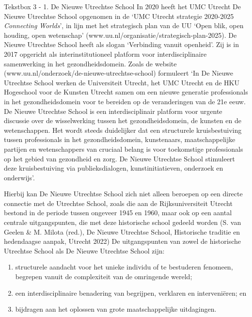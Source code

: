 \documentclass[smallauthor, chapterhaspagenum, nochapterinheader, pagenuminheader,  bigchapnum,medium2, tocpages,  garamond, titleinheader]{jote-book}
\begin{document}
	\begin{bookbox}{Tekstbox 3 - 1. De Nieuwe Utrechtse School}
		In 2020 heeft het UMC Utrecht De Nieuwe Utrechtse School opgenomen in de ‘UMC Utrecht strategie 2020-2025 \emph{Connecting}\emph{ }\emph{Worlds}', in lijn met het strategisch plan van de UU ‘Open blik, open houding, open wetenschap' (www.uu.nl/organisatie/strategisch-plan-2025). De Nieuwe Utrechtse School heeft als slogan ‘Verbinding vanuit openheid'. Zij is in 2017 opgericht als interinstitutioneel platform voor interdisciplinaire samenwerking in het gezondheidsdomein. Zoals de website (www.uu.nl/onderzoek/de-nieuwe-utrechtse-school) formuleert ‘In De Nieuwe Utrechtse School werken de Universiteit Utrecht, het UMC Utrecht en de HKU Hogeschool voor de Kunsten Utrecht samen om een nieuwe generatie professionals in het gezondheidsdomein voor te bereiden op de veranderingen van de 21e eeuw. De Nieuwe Utrechtse School is een interdisciplinair platform voor urgente discussie over de wisselwerking tussen het gezondheidsdomein, de kunsten en de wetenschappen. Het wordt steeds duidelijker dat een structurele kruisbestuiving tussen professionals in het gezondheidsdomein, kunstenaars, maatschappelijke partijen en wetenschappers van cruciaal belang is voor toekomstige professionals op het gebied van gezondheid en zorg. De Nieuwe Utrechtse School stimuleert deze kruisbestuiving via publieksdialogen, kunstinitiatieven, onderzoek en onderwijs'.

		\vspace*{\baselineskip}

		Hierbij kan De Nieuwe Utrechtse School zich niet alleen beroepen op een directe connectie met de Utrechtse School, zoals die aan de Rijksuniversiteit Utrecht bestond in de periode tussen ongeveer 1945 en 1960, maar ook op een aantal centrale uitgangspunten, die met deze historische school gedeeld worden (S. van Geelen \& M. Milota (red.), De Nieuwe Utrechtse School, Historische traditie en hedendaagse aanpak, Utrecht 2022) De uitgangspunten van zowel de historische Utrechtse School als De Nieuwe Utrechtse School zijn:
	\end{bookbox}
	\begin{enumerate}


		\item structurele aandacht voor het unieke individu of te bestuderen fenomeen, begrepen vanuit de complexiteit van de omringende wereld;



		\item een interdisciplinaire benadering van begrijpen, verklaren en interveniëren; en



		\item bijdragen aan het oplossen van grote maatschappelijke uitdagingen.


	\end{enumerate}
\end{document}
